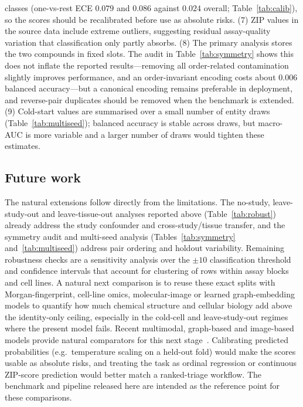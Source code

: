 \documentclass{bmcart}
\begin{document}
classes (one-vs-rest ECE $0.079$ and $0.086$ against $0.024$ overall; Table~\ref{tab:calib}), so the
scores should be recalibrated before use as absolute risks. (7) ZIP values in the source data include extreme outliers,
suggesting residual assay-quality variation that classification only partly absorbs. (8) The primary
analysis stores the two compounds in fixed slots. The audit in Table~\ref{tab:symmetry} shows this does
not inflate the reported results---removing all order-related contamination slightly improves
performance, and an order-invariant encoding costs about $0.006$ balanced accuracy---but a canonical
encoding remains preferable in deployment, and reverse-pair duplicates should be removed when the
benchmark is extended. (9) Cold-start values are summarised over a small number of entity draws
(Table~\ref{tab:multiseed}); balanced accuracy is stable across draws, but macro-AUC is more variable
and a larger number of draws would tighten these estimates.

\subsection*{Future work}
The natural extensions follow directly from the limitations. The no-study, leave-study-out and
leave-tissue-out analyses reported above (Table~\ref{tab:robust}) already address the study confounder
and cross-study/tissue transfer, and the symmetry audit and multi-seed analysis
(Tables~\ref{tab:symmetry} and~\ref{tab:multiseed}) address pair ordering and holdout variability.
Remaining robustness checks are a sensitivity analysis over the $\pm 10$ classification threshold and
confidence intervals that account for clustering of rows within assay blocks and cell lines.
A natural next comparison is to reuse these exact splits with Morgan-fingerprint,
cell-line omics, molecular-image or learned graph-embedding models to quantify how much chemical
structure and cellular biology add above the identity-only ceiling, especially in the cold-cell and
leave-study-out regimes where the present model fails. Recent
multimodal, graph-based and image-based models provide natural comparators for this next
stage~\cite{monem2024,besharatifard2024,mehrabani2025}. Calibrating predicted probabilities (e.g.\
temperature scaling on a held-out fold) would make the scores usable as absolute risks, and treating
the task as ordinal regression or continuous ZIP-score prediction would better match a ranked-triage
workflow. The benchmark and pipeline released here are intended as the reference point for these
comparisons.
\end{document}
